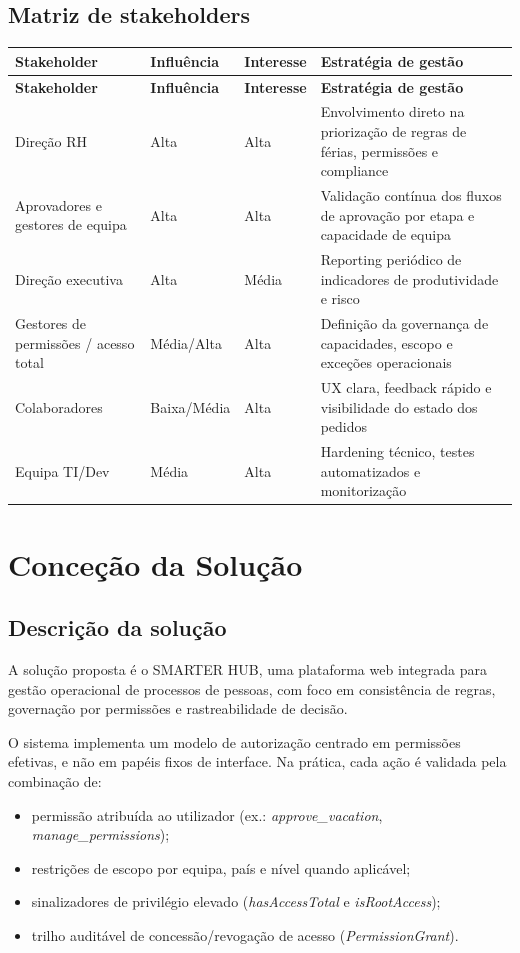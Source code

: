 \documentclass[11pt,a4paper]{article}
\begin{document}
\subsection{Matriz de stakeholders}
\begin{longtable}{p{4.2cm} p{3.0cm} p{3.0cm} p{4.8cm}}
\toprule
\textbf{Stakeholder} & \textbf{Influência} & \textbf{Interesse} & \textbf{Estratégia de gestão} \\
\midrule
\endfirsthead
\toprule
\textbf{Stakeholder} & \textbf{Influência} & \textbf{Interesse} & \textbf{Estratégia de gestão} \\
\midrule
\endhead
Direção RH & Alta & Alta & Envolvimento direto na priorização de regras de férias, permissões e compliance \\
Aprovadores e gestores de equipa & Alta & Alta & Validação contínua dos fluxos de aprovação por etapa e capacidade de equipa \\
Direção executiva & Alta & Média & Reporting periódico de indicadores de produtividade e risco \\
Gestores de permissões / acesso total & Média/Alta & Alta & Definição da governança de capacidades, escopo e exceções operacionais \\
Colaboradores & Baixa/Média & Alta & UX clara, feedback rápido e visibilidade do estado dos pedidos \\
Equipa TI/Dev & Média & Alta & Hardening técnico, testes automatizados e monitorização \\
\bottomrule
\end{longtable}

\section{Conceção da Solução}
\subsection{Descrição da solução}
A solução proposta é o SMARTER HUB, uma plataforma web integrada para gestão operacional de processos de pessoas, com foco em consistência de regras, governação por permissões e rastreabilidade de decisão.

O sistema implementa um modelo de autorização centrado em permissões efetivas, e não em papéis fixos de interface. Na prática, cada ação é validada pela combinação de:

\begin{itemize}
  \item permissão atribuída ao utilizador (ex.: \textit{approve\_vacation}, \textit{manage\_permissions});
  \item restrições de escopo por equipa, país e nível quando aplicável;
  \item sinalizadores de privilégio elevado (\textit{hasAccessTotal} e \textit{isRootAccess});
  \item trilho auditável de concessão/revogação de acesso (\textit{PermissionGrant}).
\end{itemize}
\end{document}
